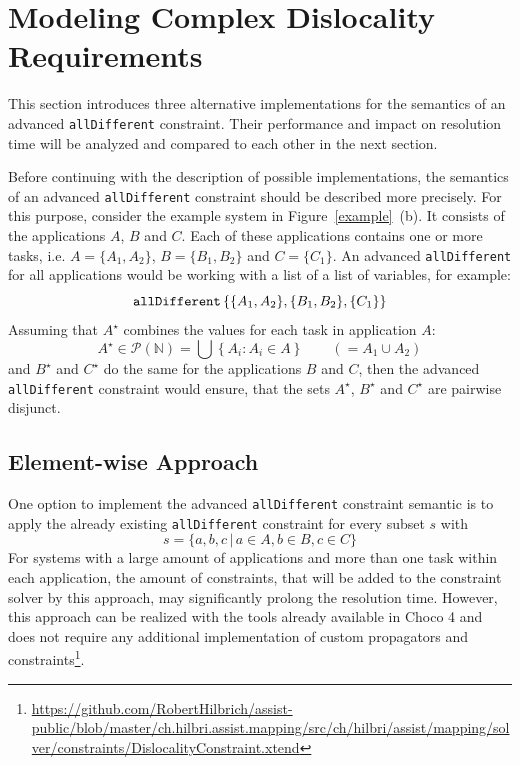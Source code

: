 \documentclass[english,biblatex]{lni}
\begin{document}
\section{Modeling Complex Dislocality Requirements}

This section introduces three alternative implementations for the semantics of an advanced \texttt{allDifferent} constraint.
Their performance and impact on resolution time will be analyzed and compared to each other in the next section.

Before continuing with the description of possible implementations, the semantics of an advanced \texttt{allDifferent} constraint should be described more precisely.
For this purpose, consider the example system in Figure~\ref{example}~(b).
It consists of the applications $A$, $B$ and $C$.
Each of these applications contains one or more tasks, i.e. $A = \{A_1, A_2\}$, $B = \{B_1, B_2\}$ and $C = \{C_1\}$.
An advanced \texttt{allDifferent} for all applications would be working with a list of a list of variables, for example:
$$\textrm{\texttt{allDifferent}}\left\{\{A_1, A_2\}, \{B_1, B_2\}, \{C_1\}\right\}$$
Assuming that $A^\star$ combines the values for each task in application $A$:
$$A^\star \in \mathcal{P}(\mathbb{N}) = \bigcup \left\{A_i : A_i \in A\right\} \qquad ( = A_1\cup A_2)$$
and $B^\star$ and $C^\star$ do the same for the applications $B$ and $C$, then the advanced \texttt{allDifferent} constraint would ensure, that the sets $A^\star$, $B^\star$ and $C^\star$ are pairwise disjunct.

\subsection*{Element-wise Approach}

One option to implement the advanced \texttt{allDifferent} constraint semantic is to apply the already existing \texttt{allDifferent} constraint for every subset $s$ with
$$s = \{a,b,c \, \vert \, a \in A,  b \in B, c \in C\}$$
For systems with a large amount of applications and more than one task within each application, the amount of constraints, that will be added to the constraint solver by this approach, may significantly prolong the resolution time.
However, this approach can be realized with the tools already available in Choco 4 and does not require any additional implementation of custom propagators and constraints\footnote{\url{https://github.com/RobertHilbrich/assist-public/blob/master/ch.hilbri.assist.mapping/src/ch/hilbri/assist/mapping/solver/constraints/DislocalityConstraint.xtend}}.
\end{document}
